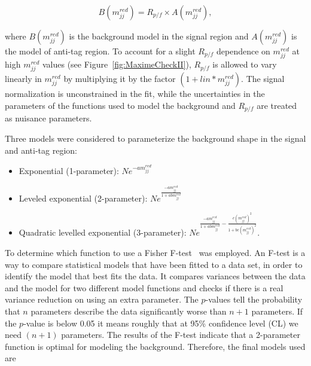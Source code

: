 
\begin{equation}
B(m_{jj}^{red})= R_{p/f}\times A(m_{jj}^{red}),
\end{equation}

\noindent
where $B(m_{jj}^{red})$ is the background model in the signal region and $A(m_{jj}^{red})$ is the model of anti-tag region. To account for a slight $R_{p/f}$ dependence on $m_{jj}^{red}$ at high $m_{jj}^{red}$  values (see Figure~\ref{fig:MaximeCheckII}), $R_{p/f}$ is allowed to vary linearly in $m_{jj}^{red}$ by multiplying it by the factor $(1+lin\ast m_{jj}^{red})$. The signal normalization is unconstrained in the fit, while the uncertainties in the parameters of the functions used to model the background and $R_{p/f}$ are treated as nuisance parameters. 

Three models were considered to parameterize the background shape in the signal and anti-tag region: 

\begin{itemize}
\item
Exponential (1-parameter): $N e^{-a m_{jj}^{red}}$

\item
Leveled exponential (2-parameter): $N e^{\frac{-a m_{jj}^{red}}{1+abm_{jj}^{red}}}$

\item
Quadratic levelled exponential (3-parameter): $N e^{\frac{-am_{jj}^{red}}{1+abm_{jj}^{red}}-\frac{c(m_{jj}^{red})^2}{1+bc(m_{jj}^{red})^2}}$.
\end{itemize}

\noindent
To determine which function to use a Fisher F-test~\cite{FTest} was employed. An F-test is a way to compare statistical models that have been fitted to a data set, in order to identify the model that best fits the data. It compares variances between the data and the model for two different model functions and checks if there is a real variance reduction on using an extra parameter. The $p$-values tell the probability that $n$ parameters describe the data significantly worse than $n+1$ parameters. If the $p$-value is below 0.05 it means roughly that at 95\% confidence level (CL) we need $(n+1)$ parameters. The results of the F-test indicate that a 2-parameter function is optimal for modeling the background. Therefore, the final models used are

